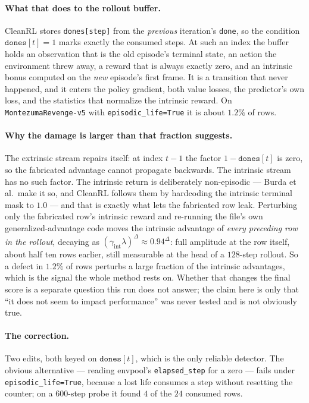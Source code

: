\paragraph{What that does to the rollout buffer.}
CleanRL stores \texttt{dones[step]} from the \emph{previous} iteration's \texttt{done}, so the
condition $\texttt{dones}[t]=1$ marks exactly the consumed steps. At such an index the buffer holds
an observation that is the old episode's terminal state, an action the environment threw away, a
reward that is always exactly zero, and an intrinsic bonus computed on the \emph{new} episode's first
frame. It is a transition that never happened, and it enters the policy gradient, both value losses,
the predictor's own loss, and the statistics that normalize the intrinsic reward. On
\texttt{Montezuma\allowbreak Revenge-v5} with \texttt{episodic\_life=True} it is about $1.2\%$ of
rows.

\paragraph{Why the damage is larger than that fraction suggests.}
The extrinsic stream repairs itself: at index $t-1$ the factor $1 - \texttt{dones}[t]$ is zero, so
the fabricated advantage cannot propagate backwards. The intrinsic stream has no such factor. The
intrinsic return is deliberately non-episodic --- Burda et al.\ make it so, and CleanRL follows them
by hardcoding the intrinsic terminal mask to $1.0$ --- and that is exactly what lets the fabricated
row leak. Perturbing only the fabricated row's intrinsic reward and re-running the file's own
generalized-advantage code moves the intrinsic advantage of \emph{every preceding row in the
rollout}, decaying as $(\gamma_{\mathrm{int}}\lambda)^{\Delta} \approx 0.94^{\Delta}$: full amplitude
at the row itself, about half ten rows earlier, still measurable at the head of a $128$-step rollout.
So a defect in $1.2\%$ of rows perturbs a large fraction of the intrinsic advantages, which is the
signal the whole method rests on. Whether that changes the final score is a separate question this
run does not answer; the claim here is only that ``it does not seem to impact performance'' was never
tested and is not obviously true.

\paragraph{The correction.}
Two edits, both keyed on $\texttt{dones}[t]$, which is the only reliable detector. The obvious
alternative --- reading envpool's \texttt{elapsed\_step} for a zero --- fails under
\texttt{episodic\_life=True}, because a lost life consumes a step without resetting the counter; on a
$600$-step probe it found $4$ of the $24$ consumed rows.

